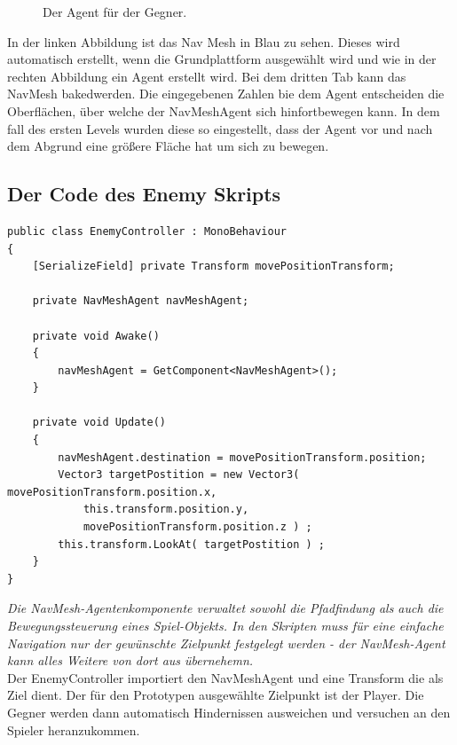 \begin{figure}[h]
\begin{minipage}[b]{0.45\textwidth}
        \caption{Der Agent für der Gegner.}
        \label{fig:PE0SD022}
    \end{minipage}
\end{figure}

In der linken Abbildung ist das Nav Mesh in Blau zu sehen. Dieses wird automatisch erstellt, wenn die Grundplattform ausgewählt wird und wie in der rechten Abbildung ein Agent erstellt wird. Bei dem dritten Tab kann das NavMesh \glqq baked\grqq \space werden. Die eingegebenen Zahlen bie dem Agent entscheiden die Oberflächen, über welche der NavMeshAgent sich hinfortbewegen kann. In dem fall des ersten Levels wurden diese so eingestellt, dass der Agent vor und nach dem Abgrund eine größere Fläche hat um sich zu bewegen. 


\pagebreak
\subsection{Der Code des Enemy Skripts}
\begin{lstlisting}[language=CSharp,caption={EnemyController Klasse.},label=code:enemyController]
public class EnemyController : MonoBehaviour
{
    [SerializeField] private Transform movePositionTransform;

    private NavMeshAgent navMeshAgent;

    private void Awake()
    {
        navMeshAgent = GetComponent<NavMeshAgent>();
    }
    
    private void Update()
    {
        navMeshAgent.destination = movePositionTransform.position;
        Vector3 targetPostition = new Vector3( movePositionTransform.position.x, 
            this.transform.position.y, 
            movePositionTransform.position.z ) ;
        this.transform.LookAt( targetPostition ) ;
    }
}
\end{lstlisting}

\emph{\glqq Die NavMesh-Agentenkomponente verwaltet sowohl die Pfadfindung als auch die Bewegungssteuerung eines Spiel-Objekts. In den Skripten muss für eine einfache Navigation nur der gewünschte Zielpunkt festgelegt werden - der NavMesh-Agent kann alles Weitere von dort aus übernehemn.\grqq}~\cite[Unity NavMesh Dokumentation]{unitydocNavmesh} \\

Der EnemyController importiert den NavMeshAgent und eine Transform die als Ziel dient. Der für den Prototypen ausgewählte Zielpunkt ist der Player. Die Gegner werden dann automatisch Hindernissen ausweichen und versuchen an den Spieler heranzukommen. 

